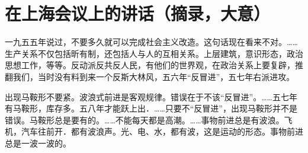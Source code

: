 \section[在上海会议上的讲话（摘录，大意）（一九五九年三月）]{在上海会议上的讲话（摘录，大意）}


一九五五年说过，不要多久就可以完成社会主义改造。这句话现在看来不对。……生产关系不仅包括昕有制，还包括人与人的互相关系。上层建筑，意识形态，政治思想工作，等等。反动派反共反人民，有他们的世界观，在政治关系上要复辟，推翻我们，当时没有料到来一个反斯大林风，五六年“反冒进”，五七年右派进攻。

出现马鞍形不要紧。波浪式前进是客观规律。错误在于不该“反冒进”。……五七年有马鞍形，库存多。五八年才能跃上出．……只要不“反冒进”，出现马鞍形并不是错误。马鞍形总是要有的。……不能每天都是高潮。……事物前进总是有波浪。飞机，汽车往前开．都有波浪声。光、电、水，都有波，这是运动的形态。事物前进总是一波一波的。


